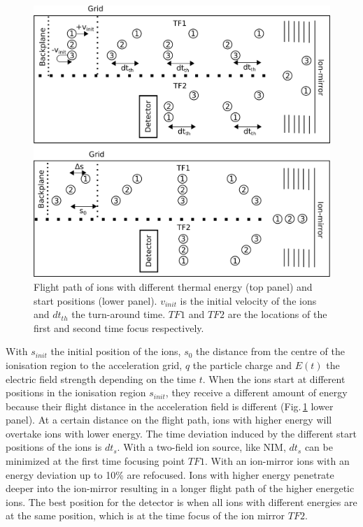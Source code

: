 	\begin{figure}[H] %
	\centering
	\includegraphics[width= .9\textwidth]{Bilder/ISStartPosThermEn.png}
	\caption{Flight path of ions with different thermal energy (top panel) and start positions (lower panel). $v_{init}$ is the initial velocity of the ions and $dt_{th}$ the turn-around time. $TF1$ and $TF2$ are the locations of the first and second time focus respectively.}
	\label{fig:thISStartPosThermEn}
\end{figure}

	With $s_{init}$ the initial position of the ions, $s_0$ the distance from the centre of the ionisation region to the acceleration grid, $q$ the particle charge and $E(t)$ the electric field strength depending on the time $t$. When the ions start at different positions in the ionisation region $s_{init}$, they receive a different amount of energy because their flight distance in the acceleration field is different (Fig.\,\ref{fig:thISStartPosThermEn} lower panel). At a certain distance on the flight path, ions with higher energy will overtake ions with lower energy. The time deviation induced by the different start positions of the ions is $dt_{s}$. With a two-field ion source, like NIM, $dt_s$ can be minimized at the first time focusing point $TF1$. With an ion-mirror ions with an energy deviation up to 10\% are refocused. Ions with higher energy penetrate deeper into the ion-mirror resulting in a longer flight path of the higher energetic ions. The best position for the detector is when all ions with different energies are at the same position, which is at the time focus of the ion mirror $TF2$.\\
	
